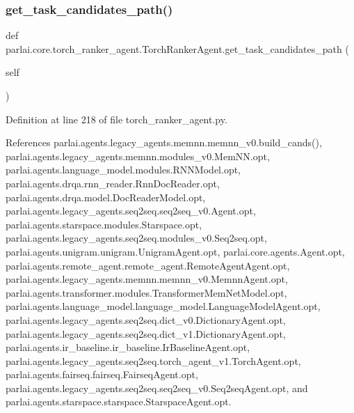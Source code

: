 \subsubsection{\texorpdfstring{get\+\_\+task\+\_\+candidates\+\_\+path()}{get\_task\_candidates\_path()}}
{\footnotesize\ttfamily def parlai.\+core.\+torch\+\_\+ranker\+\_\+agent.\+Torch\+Ranker\+Agent.\+get\+\_\+task\+\_\+candidates\+\_\+path (\begin{DoxyParamCaption}\item[{}]{self }\end{DoxyParamCaption})}



Definition at line 218 of file torch\+\_\+ranker\+\_\+agent.\+py.



References parlai.\+agents.\+legacy\+\_\+agents.\+memnn.\+memnn\+\_\+v0.\+build\+\_\+cands(), parlai.\+agents.\+legacy\+\_\+agents.\+memnn.\+modules\+\_\+v0.\+Mem\+N\+N.\+opt, parlai.\+agents.\+language\+\_\+model.\+modules.\+R\+N\+N\+Model.\+opt, parlai.\+agents.\+drqa.\+rnn\+\_\+reader.\+Rnn\+Doc\+Reader.\+opt, parlai.\+agents.\+drqa.\+model.\+Doc\+Reader\+Model.\+opt, parlai.\+agents.\+legacy\+\_\+agents.\+seq2seq.\+seq2seq\+\_\+v0.\+Agent.\+opt, parlai.\+agents.\+starspace.\+modules.\+Starspace.\+opt, parlai.\+agents.\+legacy\+\_\+agents.\+seq2seq.\+modules\+\_\+v0.\+Seq2seq.\+opt, parlai.\+agents.\+unigram.\+unigram.\+Unigram\+Agent.\+opt, parlai.\+core.\+agents.\+Agent.\+opt, parlai.\+agents.\+remote\+\_\+agent.\+remote\+\_\+agent.\+Remote\+Agent\+Agent.\+opt, parlai.\+agents.\+legacy\+\_\+agents.\+memnn.\+memnn\+\_\+v0.\+Memnn\+Agent.\+opt, parlai.\+agents.\+transformer.\+modules.\+Transformer\+Mem\+Net\+Model.\+opt, parlai.\+agents.\+language\+\_\+model.\+language\+\_\+model.\+Language\+Model\+Agent.\+opt, parlai.\+agents.\+legacy\+\_\+agents.\+seq2seq.\+dict\+\_\+v0.\+Dictionary\+Agent.\+opt, parlai.\+agents.\+legacy\+\_\+agents.\+seq2seq.\+dict\+\_\+v1.\+Dictionary\+Agent.\+opt, parlai.\+agents.\+ir\+\_\+baseline.\+ir\+\_\+baseline.\+Ir\+Baseline\+Agent.\+opt, parlai.\+agents.\+legacy\+\_\+agents.\+seq2seq.\+torch\+\_\+agent\+\_\+v1.\+Torch\+Agent.\+opt, parlai.\+agents.\+fairseq.\+fairseq.\+Fairseq\+Agent.\+opt, parlai.\+agents.\+legacy\+\_\+agents.\+seq2seq.\+seq2seq\+\_\+v0.\+Seq2seq\+Agent.\+opt, and parlai.\+agents.\+starspace.\+starspace.\+Starspace\+Agent.\+opt.

